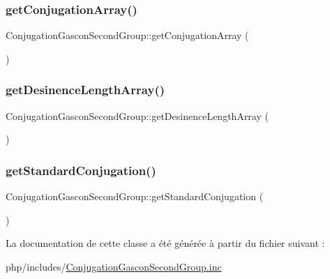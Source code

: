 \subsubsection{\texorpdfstring{get\+Conjugation\+Array()}{getConjugationArray()}}
{\footnotesize\ttfamily Conjugation\+Gascon\+Second\+Group\+::get\+Conjugation\+Array (\begin{DoxyParamCaption}{ }\end{DoxyParamCaption})\hspace{0.3cm}{\ttfamily [protected]}}

\hypertarget{class_conjugation_gascon_second_group_a1584544e4c12dd19fa52703d37ced44d}{}\label{class_conjugation_gascon_second_group_a1584544e4c12dd19fa52703d37ced44d} 
\subsubsection{\texorpdfstring{get\+Desinence\+Length\+Array()}{getDesinenceLengthArray()}}
{\footnotesize\ttfamily Conjugation\+Gascon\+Second\+Group\+::get\+Desinence\+Length\+Array (\begin{DoxyParamCaption}{ }\end{DoxyParamCaption})\hspace{0.3cm}{\ttfamily [protected]}}

\hypertarget{class_conjugation_gascon_second_group_a53a63dc5e1a47aa4035efa26a1b45bf1}{}\label{class_conjugation_gascon_second_group_a53a63dc5e1a47aa4035efa26a1b45bf1} 
\subsubsection{\texorpdfstring{get\+Standard\+Conjugation()}{getStandardConjugation()}}
{\footnotesize\ttfamily Conjugation\+Gascon\+Second\+Group\+::get\+Standard\+Conjugation (\begin{DoxyParamCaption}{ }\end{DoxyParamCaption})\hspace{0.3cm}{\ttfamily [protected]}}



La documentation de cette classe a été générée à partir du fichier suivant \+:\begin{DoxyCompactItemize}
\item 
php/includes/\hyperlink{_conjugation_gascon_second_group_8inc}{Conjugation\+Gascon\+Second\+Group.\+inc}\end{DoxyCompactItemize}

